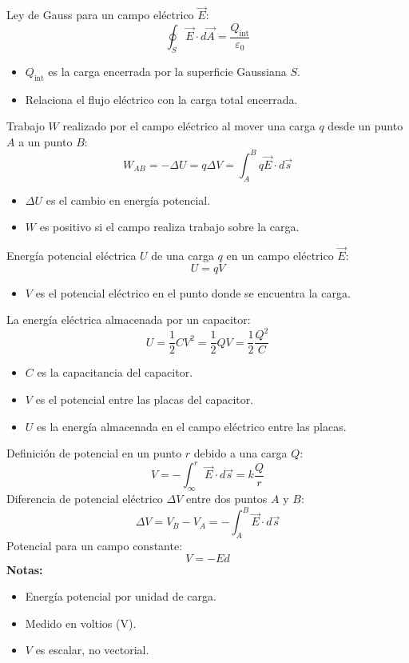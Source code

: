 \begin{tcolorbox}[title=Ley de Gauss]
  Ley de Gauss para un campo eléctrico $\vec{E}$:
  \[
    \oint_S \vec{E} \cdot d\vec{A} = \frac{Q_{\text{int}}}{\varepsilon_0}
  \]
  \begin{itemize}
    \item $Q_{\text{int}}$ es la carga encerrada por la superficie Gaussiana $S$.
    \item Relaciona el flujo eléctrico con la carga total encerrada.
  \end{itemize}  
\end{tcolorbox}

\begin{tcolorbox}[title=Trabajo Eléctrico]
  Trabajo $W$ realizado por el campo eléctrico al mover una carga $q$ desde un punto $A$ a un punto $B$:
  \[
    W_{AB} = -\Delta U = q \Delta V = \int_{A}^{B} q\vec{E} \cdot d\vec{s}
  \]
  \begin{itemize}
    \item $\Delta U$ es el cambio en energía potencial.
    \item $W$ es positivo si el campo realiza trabajo sobre la carga.
  \end{itemize}
\end{tcolorbox}
  
\begin{tcolorbox}[title=Energía Potencial]
  Energía potencial eléctrica $U$ de una carga $q$ en un campo eléctrico $\vec{E}$:
  \[
    U = qV
  \]
  \begin{itemize}
    \item $V$ es el potencial eléctrico en el punto donde se encuentra la carga.
  \end{itemize}
  La energía eléctrica almacenada por un capacitor:
  \[
    U = \frac{1}{2} CV^2 = \frac{1}{2} QV = \frac{1}{2} \frac{Q^2}{C}
  \]
  \begin{itemize}
    \item $C$ es la capacitancia del capacitor.
    \item $V$ es el potencial entre las placas del capacitor.
    \item $U$ es la energía almacenada en el campo eléctrico entre las placas.
  \end{itemize}
\end{tcolorbox}
  
\begin{tcolorbox}[title=Potencial Eléctrico]
  Definición de potencial en un punto \(r\) debido a una carga $Q$:
  \[
    V = -\int_{\infty}^{r} \vec{E} \cdot d\vec{s} = k \frac{Q}{r}
  \]
  Diferencia de potencial eléctrico $\Delta V$ entre dos puntos $A$ y $B$:
  \[
    \Delta V = V_B - V_A = -\int_{A}^{B} \vec{E} \cdot d\vec{s}
  \]
  Potencial para un campo constante:
  \[
    V = -Ed
  \]
  \textbf{Notas:}
  \begin{itemize}
    \item Energía potencial por unidad de carga.
    \item Medido en voltios (V).
    \item $V$ es escalar, no vectorial.
  \end{itemize}
\end{tcolorbox}

